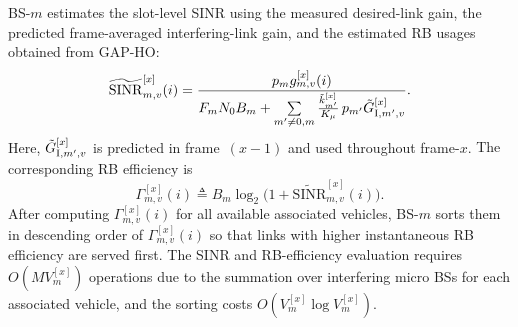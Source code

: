 \documentclass[10pt,journal,letterpaper]{IEEEtran}
\newcommand{\rev}[1]{\textcolor{revisioncolor}{{}#1}}
\newcommand{\omitted}[1]{}
\theoremstyle{remark}
\begin{document}
\omitted{}\rev{BS-$m$ estimates the slot-level SINR using the measured desired-link gain, the predicted frame-averaged interfering-link gain, and the estimated RB usages obtained from GAP-HO:}
\begin{equation}
\label{eq:OTR-RA_SINR_hat}
    \widetilde{\mathrm{SINR}}_{m,v}^{[x]}(i)
    =
    \frac{p_m g_{m,v}^{[x]}(i)}
         {F_m N_0 B_m
          + \sum\limits_{m'\neq 0,m}
            \frac{\Tilde{k}_{m'}^{[x]}}{K_\mu}\, p_{m'} \omitted{}\rev{\Tilde{G}_{{\rm I},m',v}^{[x]}}}.
\end{equation}
\rev{Here, $\Tilde{G}_{{\rm I},m',v}^{[x]}$ is predicted in frame~$(x-1)$ and used throughout frame-$x$.}
The corresponding RB efficiency is
\begin{equation}
    \label{eq:OTR-RA_RBe}
    \Gamma_{m,v}^{[x]}(i)
    \triangleq
    B_m\log_2\!\bigl(1+\widetilde{\mathrm{SINR}}_{m,v}^{[x]}(i)\bigr).
\end{equation}
After computing $\Gamma_{m,v}^{[x]}(i)$ for all \rev{available }associated vehicles, BS-$m$ sorts them in descending order of $\Gamma_{m,v}^{[x]}(i)$ so that links with higher instantaneous RB efficiency are served first. The SINR and RB-efficiency evaluation requires $O (MV^{[x]}_{m} )$ operations due to the summation over interfering micro BSs for each associated vehicle, and the sorting costs $O (V^{[x]}_{m}\log V^{[x]}_{m} )$.
\end{document}
